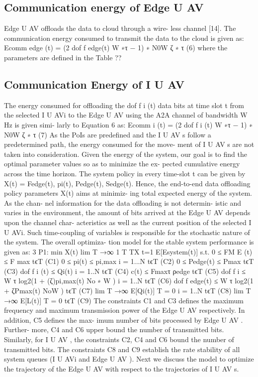 \documentclass{article}
\begin{document}
\begin{multicols}{2}
\subsection{Communication energy of Edge U AV}
Edge U AV offloads the data to cloud through a wire-
less channel [14]. The communication energy consumed
to transmit the data to the cloud is given as:
Ecomm
edge (t) = (2
dof f
edge(t)
W ∗τ − 1) ∗ N0W
ζ ∗ τ (6)
where the parameters are defined in the Table ??
\subsection{Communication Energy of I U AV}
The energy consumed for offloading the dof f
i (t) data bits
at time slot t from the selected I U AVi to the Edge U AV
using the A2A channel of bandwidth W Hz is given simi-
larly to Equation 6 as:
Ecomm
i (t) = (2 dof f
i (t)
W ∗τ − 1) ∗ N0W
ζ ∗ τ (7)
As the PoIs are predefined and the I U AV s follow a
predetermined path, the energy consumed for the move-
ment of I U AV s are not taken into consideration.
Given the energy of the system, our goal is to find
the optimal parameter values so as to minimize the ex-
pected cumulative energy across the time horizon. The
system policy in every time-slot t can be given by X(t) =
{Fedge(t), pi(t), Pedge(t), Sedge(t)}. Hence, the end-to-end
data offloading policy parameters X(t) aims at minimiz-
ing total expected energy of the system. As the chan-
nel information for the data offloading is not determin-
istic and varies in the environment, the amount of bits
arrived at the Edge U AV depends upon the channel char-
acteristics as well as the current position of the selected
I U AVi. Such time-coupling of variables is responsible for
the stochastic nature of the system. The overall optimiza-
tion model for the stable system performance is given as:
3
P1: min
X(t) lim
T →∞
1
T
TX
t=1
E[Esystem(t)]
s.t.
0 ≤ FM E (t) ≤ F max tϵT (C1)
0 ≤ pi(t) ≤ pi,max i = 1...N tϵT (C2)
0 ≤ Pedge(t) ≤ Pmax tϵT (C3)
dof f
i (t) ≤ Qi(t) i = 1..N tϵT (C4)
c(t) ≤ Fmaxτ
ρedge
tϵT (C5)
dof f
i ≤ W τ log2(1 + (ζ)pi,max(t)
No ∗ W ) i = 1..N tϵT (C6)
dof f
edge(t) ≤ W τ log2(1 + ζPmax(t)
NoW ) tϵT (C7)
lim
T →∞
E[Qi(t)]
T = 0 i = 1..N tϵT (C8)
lim
T →∞
E[L(t)]
T = 0 tϵT (C9)
The constraints C1 and C3 defines the maximum
frequency and maximum transmission power of the
Edge U AV respectively. In addition, C5 defines the max-
imum number of bits processed by Edge U AV . Further-
more, C4 and C6 upper bound the number of transmitted
bits. Similarly, for I U AV , the constraints C2, C4 and C6
bound the number of transmitted bits. The constraints
C8 and C9 establish the rate stability of all system queues
(I U AVi and Edge U AV ). Next we discuss the model to
optimize the trajectory of the Edge U AV with respect to
the trajectories of I U AV s.


\end{multicols}
\end{document}

